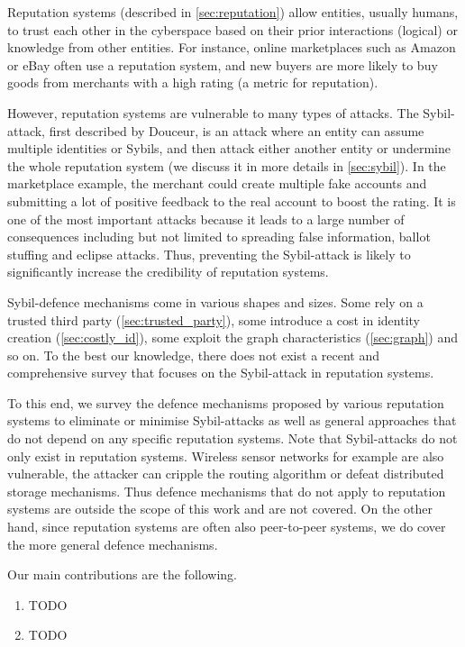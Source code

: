 Reputation systems (described in \autoref{sec:reputation}) allow entities,
usually humans, to trust each other in the cyberspace based on their prior
interactions (logical) or knowledge from other entities. For instance, online
marketplaces such as Amazon or eBay often use a reputation system, and new
buyers are more likely to buy goods from merchants with a high rating (a metric
for reputation).

However, reputation systems are vulnerable to many types of attacks. The
Sybil-attack, first described by Douceur\cite{douceur2002sybil}, is an attack
where an entity can assume multiple identities or Sybils, and then attack either
another entity or undermine the whole reputation system (we discuss it in more
details in \autoref{sec:sybil}). In the marketplace example, the merchant could
create multiple fake accounts and submitting a lot of positive feedback to the
real account to boost the rating. It is one of the most important attacks
because it leads to a large number of consequences including but not limited to
spreading false information, ballot stuffing\cite{bhattacharjee2005avoiding} and
eclipse attacks\cite{singh2006eclipse}. Thus, preventing the Sybil-attack is
likely to significantly increase the credibility of reputation systems.

Sybil-defence mechanisms come in various shapes and sizes. Some rely on a
trusted third party (\autoref{sec:trusted_party}), some introduce a cost in
identity creation (\autoref{sec:costly_id}), some exploit the graph
characteristics (\autoref{sec:graph}) and so on. To the best our knowledge,
there does not exist a recent and comprehensive survey that focuses on the
Sybil-attack in reputation systems.

To this end, we survey the defence mechanisms proposed by various reputation
systems to eliminate or minimise Sybil-attacks as well as general approaches
that do not depend on any specific reputation systems. Note that Sybil-attacks
do not only exist in reputation systems. Wireless sensor networks for example
are also vulnerable, the attacker can cripple the routing algorithm or defeat
distributed storage mechanisms\cite{newsome2004sybil}. Thus defence mechanisms
that do not apply to reputation systems are outside the scope of this work and
are not covered. On the other hand, since reputation systems are often also
peer-to-peer systems, we do cover the more general defence mechanisms.

Our main contributions are the following.
\begin{enumerate}
  \item TODO
  \item TODO
\end{enumerate}

